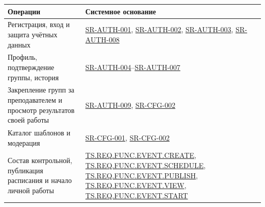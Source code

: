 \documentclass[12pt,a4paper]{article}
\newcounter{none} %
\begin{document}
{\def\LTcaptype{none} %
\begin{longtable}[]{@{}
  >{\raggedright\arraybackslash}p{}
  >{\raggedright\arraybackslash}p{}@{}}
\toprule\noalign{}
\begin{minipage}[b]{\linewidth}\raggedright
Операции
\end{minipage} & \begin{minipage}[b]{\linewidth}\raggedright
Системное основание
\end{minipage} \\
\midrule\noalign{}
\endhead
\bottomrule\noalign{}
\endlastfoot
Регистрация, вход и защита учётных данных & {\href{../04\_Системные\_требования/DOC-05\_Системные\_требования.pdf\#sr-auth-001}{SR-AUTH-001}}, {\href{../04\_Системные\_требования/DOC-05\_Системные\_требования.pdf\#sr-auth-002}{SR-AUTH-002}}, {\href{../04\_Системные\_требования/DOC-05\_Системные\_требования.pdf\#sr-auth-003}{SR-AUTH-003}}, {\href{../04\_Системные\_требования/DOC-05\_Системные\_требования.pdf\#sr-auth-008}{SR-AUTH-008}} \\
Профиль, подтверждение группы, история & {\href{../04\_Системные\_требования/DOC-05\_Системные\_требования.pdf\#sr-auth-004}{SR-AUTH-004}}--{\href{../04\_Системные\_требования/DOC-05\_Системные\_требования.pdf\#sr-auth-007}{SR-AUTH-007}} \\
Закрепление групп за преподавателем и просмотр результатов своей работы & {\href{../04\_Системные\_требования/DOC-05\_Системные\_требования.pdf\#sr-auth-009}{SR-AUTH-009}}, {\href{../04\_Системные\_требования/DOC-05\_Системные\_требования.pdf\#sr-cfg-002}{SR-CFG-002}} \\
Каталог шаблонов и модерация & {\href{../04\_Системные\_требования/DOC-05\_Системные\_требования.pdf\#sr-cfg-001}{SR-CFG-001}}, {\href{../04\_Системные\_требования/DOC-05\_Системные\_требования.pdf\#sr-cfg-002}{SR-CFG-002}} \\
Состав контрольной, публикация расписания и начало личной работы & {\href{../02\_Техническое\_задание/Техническое\_задание.pdf\#ts-req-func-event-create}{TS.REQ.FUNC.EVENT.CREATE}}, {\href{../02\_Техническое\_задание/Техническое\_задание.pdf\#ts-req-func-event-schedule}{TS.REQ.FUNC.EVENT.SCHEDULE}}, {\href{../02\_Техническое\_задание/Техническое\_задание.pdf\#ts-req-func-event-publish}{TS.REQ.FUNC.EVENT.PUBLISH}}, {\href{../02\_Техническое\_задание/Техническое\_задание.pdf\#ts-req-func-event-view}{TS.REQ.FUNC.EVENT.VIEW}}, {\href{../02\_Техническое\_задание/Техническое\_задание.pdf\#ts-req-func-event-start}{TS.REQ.FUNC.EVENT.START}} \\

\end{longtable}}
\end{document}
